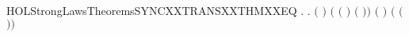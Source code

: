 \newcommand{\HOLStrongLawsTheoremsSYNCXXTRANSXXTHM}{\UseVerbatim{HOLStrongLawsTheoremsSYNCXXTRANSXXTHM}}
\begin{SaveVerbatim}{HOLStrongLawsTheoremsSYNCXXTRANSXXTHMXXEQ}
\HOLTokenTurnstile{} \HOLSymConst{\HOLTokenForall{}}     .
          \HOLTokenTransBegin{}\HOLTokenTransEnd {} \HOLSymConst{\HOLTokenEquiv{}}
     \HOLSymConst{\HOLTokenExists{}} .
        \HOLSymConst{\HOLTokenLeq{}}  \HOLSymConst{\HOLTokenConj{}} \ensuremath{(} \HOLSymConst{\ensuremath{=}}  \ensuremath{)} \HOLSymConst{\HOLTokenConj{}}
       \ensuremath{(} \ensuremath{(} \ensuremath{)} \HOLSymConst{\ensuremath{=}}  \ensuremath{(} \ensuremath{)}\ensuremath{)} \HOLSymConst{\HOLTokenConj{}} \ensuremath{(} \HOLSymConst{\ensuremath{=}} \HOLConst{\ensuremath{\tau}}\ensuremath{)} \HOLSymConst{\HOLTokenConj{}}
       \ensuremath{(} \HOLSymConst{\ensuremath{=}}  \HOLSymConst{\ensuremath{\mid}}  \ensuremath{(} \ensuremath{)}\ensuremath{)}
\end{SaveVerbatim}
\newcommand{\HOLStrongLawsTheoremsSYNCXXTRANSXXTHMXXEQ}{\UseVerbatim{HOLStrongLawsTheoremsSYNCXXTRANSXXTHMXXEQ}}
